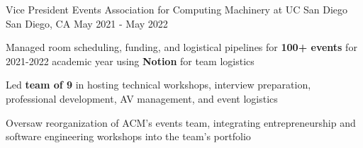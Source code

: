 \begin{cventries}
  \cventry
    {Vice President Events} %
    {Association for Computing Machinery at UC San Diego} %
    {San Diego, CA} %
    {May 2021 - May 2022} %
    {
      \begin{cvitems} %
        \item {Managed room scheduling, funding, and logistical pipelines for \textbf{100+ events} for 2021-2022 academic year using \textbf{Notion} for team logistics}
        \item {Led \textbf{team of 9} in hosting technical workshops, interview preparation, professional development, AV management, and event logistics}
        \item {Oversaw reorganization of ACM's events team, integrating entrepreneurship and software engineering workshops into the team's portfolio}
      \end{cvitems}
    }


\end{cventries}
